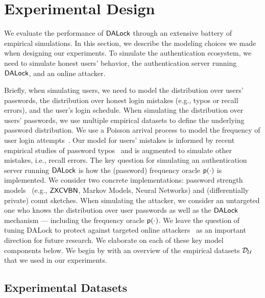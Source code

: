 


\section{Experimental Design} %


We evaluate the performance of $\mathsf{DALock}$ through an extensive battery of empirical simulations. In this section, we describe the modeling choices we made when designing our experiments. To simulate the authentication ecosystem, we need to simulate honest users' behavior, the authentication server running $\mathsf{DALock}$, and an online attacker. 



Briefly, when simulating users, we need to model the distribution over users’ passwords, the distribution over honest login mistakes (e.g., typos or recall errors), and the user's login schedule. When simulating the distribution over users’ passwords, we use multiple empirical datasets to define the underlying password distribution. We use a Poisson arrival process to model the frequency of user login attempts~\cite{AC:BloBluDat13}. Our model for users’ mistakes is informed by recent empirical studies of password typos~\cite{CCS:CWPCR17,SP:CAAJR16} and is augmented to simulate other mistakes, i.e., recall errors.  The key question for simulating an authentication server running $\mathsf{DALock}$ is how the (password) frequency oracle $\textsf{p}(\cdot)$ is implemented. We consider two concrete implementations: password strength models~\cite{ USENIX:Wheeler16,USENIX:USBCCKKMMS15,USENIX:MUSKBCC16} (e.g., $\mathsf{ZXCVBN}$, Markov Models, Neural Networks) and (differentially private) count sketches. When simulating the attacker, we consider an untargeted one who knows the distribution over user passwords as well as the $\mathsf{DALock}$ mechanism --- including the frequency oracle $\textsf{p}(\cdot)$. We leave the question of tuning DALock to protect against targeted online attackers~\cite{CCS:WZWYH16} as an important direction for future research. We elaborate on each of these key model components below.  We begin by with an overview of the empirical datasets $\mathcal{D}_{{\mathcal{U}}}$ that we used in our experiments.








\subsection{Experimental Datasets}\label{section:experiment:experiment_dataset} 


